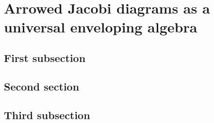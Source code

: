 \chapter{Arrowed Jacobi diagrams as a universal enveloping algebra}
\label{ch:arrowed-jacobi-diagrams-as-a-universal-enveloping-algebra}

\section{First subsection}

\section{Second section}

\section{Third subsection}
